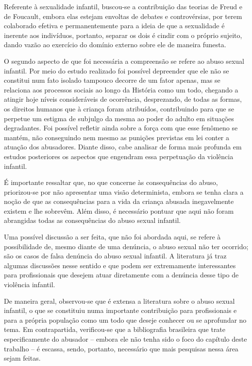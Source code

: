 Referente à sexualidade infantil, buscou-se a contribuição das teorias de Freud e de Foucault, embora elas estejam envoltas de debates e controvérsias, por  terem colaborado efetiva e permanentemente para a ideia de que a sexualidade é inerente aos indivíduos, portanto, separar os dois é cindir com o próprio sujeito, dando vazão ao exercício do domínio externo sobre ele de maneira funesta.

O segundo aspecto de que foi necessária a compreensão se refere ao abuso sexual infantil. Por meio do estudo realizado foi possível depreender que ele não se constitui num fato isolado tampouco decorre de um fator apenas, mas se relaciona aos processos sociais ao longo da História como um todo, chegando a atingir hoje níveis consideráveis de ocorrência, desprezando, de todas as formas, os direitos humanos que à criança foram atribuídos, contribuindo para que se perpetue um estigma de subjulgo da mesma ao poder do adulto em situações degradantes. Foi possível refletir ainda sobre a força com que esse fenômeno se mantém, não conseguindo nem mesmo as punições previstas em lei conter a atuação dos abusadores. Diante disso, cabe analisar de forma mais profunda em estudos posteriores os aspectos que engendram essa perpetuação da violência infantil.

É importante ressaltar que, no que concerne às consequências do abuso, priorizou-se por não apresentar uma visão determinista, embora se tenha clara a noção de que as consequências para a vida da criança abusada inegavelmente existem e lhe sobrevêm. Além disso, é necessário pontuar que aqui não foram abrangidas todas as consequências do abuso sexual infantil.

Uma possível discussão a ser feita, que não foi abordada aqui, se refere à possibilidade de, mesmo diante de uma denúncia, o abuso sexual não ter ocorrido; são os casos de falsa denúncia do abuso sexual infantil. A literatura já traz algumas discussões nesse sentido e que podem ser extremamente interessantes para profissionais que desejem atuar diretamente com a denúncia desse tipo de violência infantil.

De maneira geral, observou-se que é extensa a literatura sobre o abuso sexual infantil, o que se constituiu numa importante contribuição para profissionais e para a própria população como um todo que deseje conhecer ou se aprofundar no tema. Em contrapartida, verificou-se que a bibliografia brasileira que trate especificamente do abusador -- embora ele não tenha sido o foco do capítulo deste trabalho -- é escassa, sendo, portanto, necessário que mais pesquisas nessa área sejam feitas.

